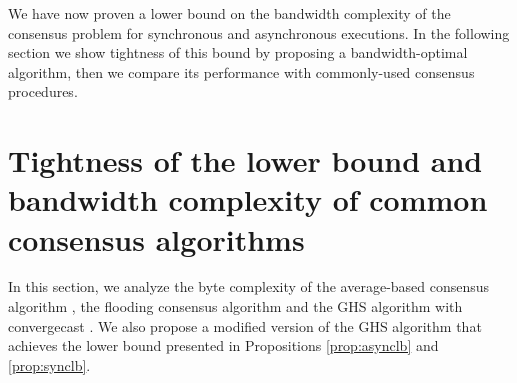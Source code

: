 \documentclass[letterpaper,10pt,conference]{ieeeconf}
\begin{document}
We have now proven a lower bound on the bandwidth complexity of the consensus problem for synchronous and asynchronous executions. In the following section we show tightness of this bound by proposing a bandwidth-optimal algorithm, then we compare its performance with commonly-used consensus procedures.

\section{Tightness of the lower bound and bandwidth complexity of common consensus algorithms}
\label{sec:algs}
In this section, we analyze the byte complexity of the average-based consensus algorithm \cite{JNT:84-extra,ROS-RMM:03c,AJ-JL-ASM:02}, the flooding consensus algorithm \cite{NL:96} and the GHS algorithm with convergecast \cite{RGG-PAH-PMS:83,FR-MP:13}. We also propose a modified version of the GHS algorithm that achieves the lower bound presented in Propositions \ref{prop:asynclb} and \ref{prop:synclb}.
\end{document}
